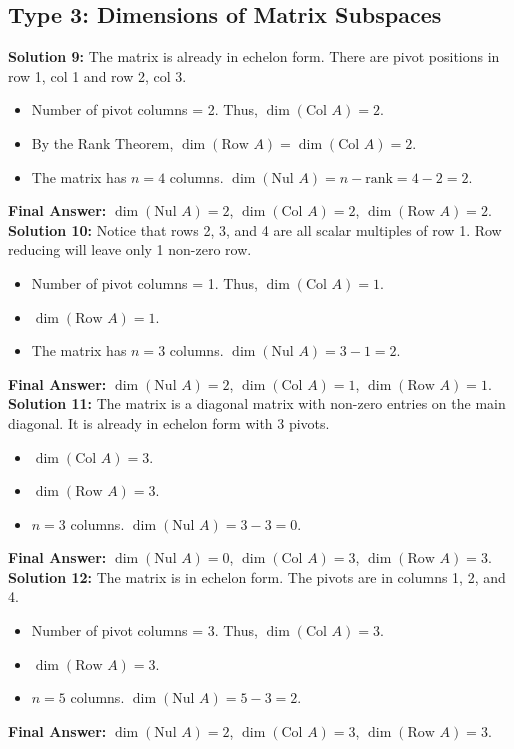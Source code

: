 \documentclass{article}
\begin{document}
\subsection*{Type 3: Dimensions of Matrix Subspaces}
\textbf{Solution 9:}
The matrix is already in echelon form. There are pivot positions in row 1, col 1 and row 2, col 3.
\begin{itemize}
    \item Number of pivot columns = 2. Thus, $\dim(\text{Col } A) = 2$.
    \item By the Rank Theorem, $\dim(\text{Row } A) = \dim(\text{Col } A) = 2$.
    \item The matrix has $n = 4$ columns. $\dim(\text{Nul } A) = n - \text{rank} = 4 - 2 = 2$.
\end{itemize}
\textbf{Final Answer:} $\dim(\text{Nul } A) = 2$, $\dim(\text{Col } A) = 2$, $\dim(\text{Row } A) = 2$. \\

\textbf{Solution 10:}
Notice that rows 2, 3, and 4 are all scalar multiples of row 1. Row reducing will leave only 1 non-zero row.
\begin{itemize}
    \item Number of pivot columns = 1. Thus, $\dim(\text{Col } A) = 1$.
    \item $\dim(\text{Row } A) = 1$.
    \item The matrix has $n = 3$ columns. $\dim(\text{Nul } A) = 3 - 1 = 2$.
\end{itemize}
\textbf{Final Answer:} $\dim(\text{Nul } A) = 2$, $\dim(\text{Col } A) = 1$, $\dim(\text{Row } A) = 1$. \\

\textbf{Solution 11:}
The matrix is a diagonal matrix with non-zero entries on the main diagonal. It is already in echelon form with 3 pivots.
\begin{itemize}
    \item $\dim(\text{Col } A) = 3$.
    \item $\dim(\text{Row } A) = 3$.
    \item $n = 3$ columns. $\dim(\text{Nul } A) = 3 - 3 = 0$.
\end{itemize}
\textbf{Final Answer:} $\dim(\text{Nul } A) = 0$, $\dim(\text{Col } A) = 3$, $\dim(\text{Row } A) = 3$. \\

\textbf{Solution 12:}
The matrix is in echelon form. The pivots are in columns 1, 2, and 4.
\begin{itemize}
    \item Number of pivot columns = 3. Thus, $\dim(\text{Col } A) = 3$.
    \item $\dim(\text{Row } A) = 3$.
    \item $n = 5$ columns. $\dim(\text{Nul } A) = 5 - 3 = 2$.
\end{itemize}
\textbf{Final Answer:} $\dim(\text{Nul } A) = 2$, $\dim(\text{Col } A) = 3$, $\dim(\text{Row } A) = 3$. \\
\end{document}
